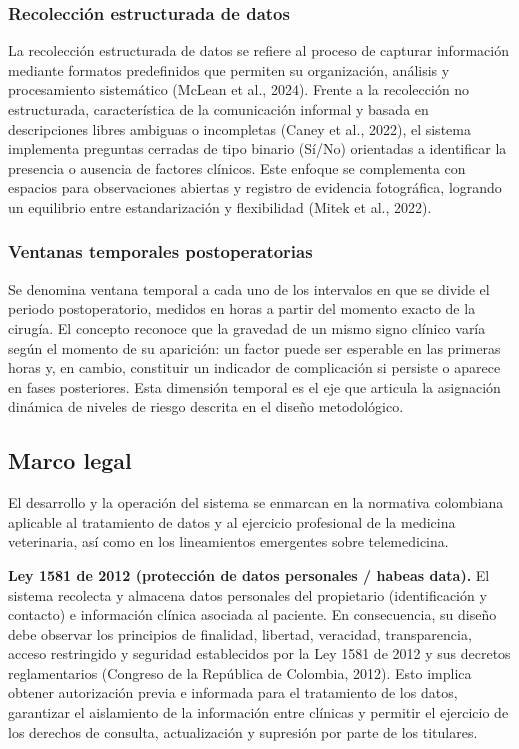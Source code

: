\documentclass[stu, spanish]{apa7}
\begin{document}
\subsubsection{Recolecci\'{o}n estructurada de datos}
La recolecci\'{o}n estructurada de datos se refiere al proceso de capturar informaci\'{o}n mediante formatos predefinidos que permiten su organizaci\'{o}n, an\'{a}lisis y procesamiento sistem\'{a}tico (McLean et al., 2024). Frente a la recolecci\'{o}n no estructurada, caracter\'{i}stica de la comunicaci\'{o}n informal y basada en descripciones libres ambiguas o incompletas (Caney et al., 2022), el sistema implementa preguntas cerradas de tipo binario (S\'{i}/No) orientadas a identificar la presencia o ausencia de factores cl\'{i}nicos. Este enfoque se complementa con espacios para observaciones abiertas y registro de evidencia fotogr\'{a}fica, logrando un equilibrio entre estandarizaci\'{o}n y flexibilidad (Mitek et al., 2022).

\subsubsection{Ventanas temporales postoperatorias}
Se denomina ventana temporal a cada uno de los intervalos en que se divide el periodo postoperatorio, medidos en horas a partir del momento exacto de la cirug\'{i}a. El concepto reconoce que la gravedad de un mismo signo cl\'{i}nico var\'{i}a seg\'{u}n el momento de su aparici\'{o}n: un factor puede ser esperable en las primeras horas y, en cambio, constituir un indicador de complicaci\'{o}n si persiste o aparece en fases posteriores. Esta dimensi\'{o}n temporal es el eje que articula la asignaci\'{o}n din\'{a}mica de niveles de riesgo descrita en el dise\~{n}o metodol\'{o}gico.

\subsection{Marco legal}
El desarrollo y la operaci\'{o}n del sistema se enmarcan en la normativa colombiana aplicable al tratamiento de datos y al ejercicio profesional de la medicina veterinaria, as\'{i} como en los lineamientos emergentes sobre telemedicina.

\textbf{Ley 1581 de 2012 (protecci\'{o}n de datos personales / habeas data).} El sistema recolecta y almacena datos personales del propietario (identificaci\'{o}n y contacto) e informaci\'{o}n cl\'{i}nica asociada al paciente. En consecuencia, su dise\~{n}o debe observar los principios de finalidad, libertad, veracidad, transparencia, acceso restringido y seguridad establecidos por la Ley 1581 de 2012 y sus decretos reglamentarios (Congreso de la Rep\'{u}blica de Colombia, 2012). Esto implica obtener autorizaci\'{o}n previa e informada para el tratamiento de los datos, garantizar el aislamiento de la informaci\'{o}n entre cl\'{i}nicas y permitir el ejercicio de los derechos de consulta, actualizaci\'{o}n y supresi\'{o}n por parte de los titulares.
\end{document}
